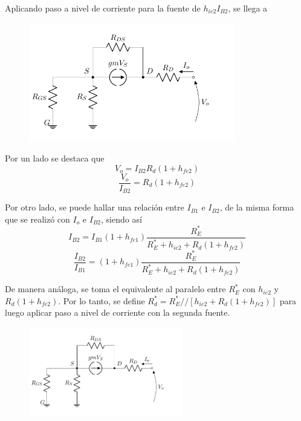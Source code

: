 Aplicando paso a nivel de corriente para la fuente de $h_{ie2} I_{B2}$, se llega a
\begin{figure}[H]
\centering
	\includegraphics[width=0.8\textwidth, page=5]{Imagenes/ModeloIncremental.pdf}
\end{figure}

Por un lado se destaca que 
\begin{equation*}
	V_o = I_{B2} R_d \left( 1 + h_{fe2} \right)
\end{equation*}
\begin{equation}
	\frac{V_o}{I_{B2}} = R_d \left( 1 + h_{fe2} \right)
\label{equ:vo-ib2}
\end{equation}

Por otro lado, se puede hallar una relación entre $I_{B1}$ e $I_{B2}$, de la misma forma que se realizó con $I_o$ e $I_{B2}$, siendo así
\begin{equation*}
	I_{B2} = I_{B1} \left( 1 + h_{fe1} \right) \frac{R_{E}^*}{ R_{E}^* + h_{ie2} + R_d \left( 1 + h_{fe2} \right) }
\end{equation*}
\begin{equation}
	\frac{I_{B2}}{I_{B1}} = \left( 1 + h_{fe1} \right) \frac{R_{E}^*}{ R_{E}^* + h_{ie2} + R_d \left( 1 + h_{fe2} \right) }
	\label{equ:ib2-ib1}
\end{equation}

De manera análoga, se toma el equivalente al paralelo entre $R_{E}^*$ con $h_{ie2}$ y $R_d \left( 1 + h_{fe2} \right)$. Por lo tanto, se define $R_{d}^* = R_{E}^* // \left[ h_{ie2} + R_d \left( 1 + h_{fe2} \right) \right]$ para luego aplicar paso a nivel de corriente con la segunda fuente.
\begin{figure}[H]
\centering
	\includegraphics[width=0.6\textwidth, page=6]{Imagenes/ModeloIncremental.pdf}
\end{figure}


